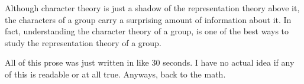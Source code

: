 Although character theory is just a shadow of the representation theory above it, the characters of a group carry a 
surprising amount of information about it. In fact, understanding the character theory of a group, is one of the 
best ways to study the representation theory of a group.

All of this prose was just written in like 30 seconds. I have no actual idea if any of this is readable or at all 
true. Anyways, back to the math.























